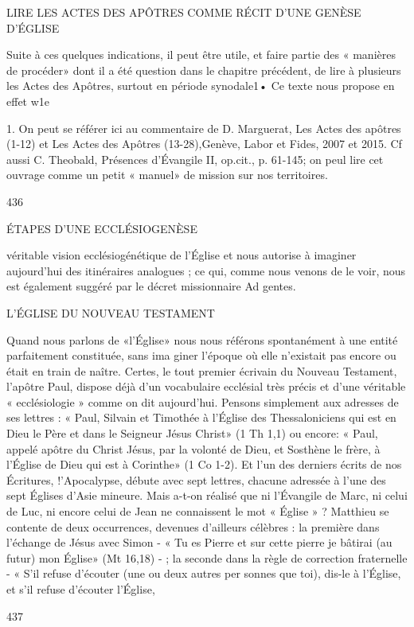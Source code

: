 LIRE LES ACTES DES APÔTRES
COMME RÉCIT D'UNE GENÈSE D'ÉGLISE

Suite à ces quelques indications, il peut être utile, et faire partie des « manières de procéder» dont il a été question dans le chapitre précédent, de lire à plusieurs les Actes des Apôtres, surtout en période synodale1• Ce texte nous propose en effet w1e

1.	On peut se référer ici au commentaire de D. Marguerat, Les Actes des apôtres (1-12) et Les Actes des Apôtres (13-28),Genève, Labor et Fides, 2007 et 2015. Cf aussi C. Theobald, Présences d'Évangile II, op.cit., p. 61-145; on peul lire cet ouvrage comme un petit « manuel» de mission sur nos territoires.

436
 
ÉTAPES D'UNE ECCLÉSIOGENÈSE

véritable vision ecclésiogénétique de l'Église et nous autorise à imaginer aujourd'hui des itinéraires analogues ; ce qui, comme nous venons de le voir, nous est également suggéré par le décret missionnaire Ad gentes.

L'ÉGLISE DU NOUVEAU TESTAMENT

Quand nous parlons de «l'Église» nous nous référons spontanément à une entité parfaitement constituée, sans ima­ giner l'époque où elle n'existait pas encore ou était en train de naître. Certes, le tout premier écrivain du Nouveau Testament, l'apôtre Paul, dispose déjà d'un vocabulaire ecclésial très précis et d'une véritable « ecclésiologie » comme on dit aujourd'hui. Pensons simplement aux adresses de ses lettres : « Paul, Silvain et Timothée à l'Église des Thessaloniciens qui est en Dieu le Père et dans le Seigneur Jésus Christ» (1 Th 1,1) ou encore: « Paul, appelé apôtre du Christ Jésus, par la volonté de Dieu, et Sosthène le frère, à l'Église de Dieu qui est à Corinthe» (1 Co 1-2). Et l'un des derniers écrits de nos Écritures, !'Apocalypse, débute avec sept lettres, chacune adressée à l'une des sept Églises d'Asie mineure.
Mais a-t-on réalisé que ni l'Évangile de Marc, ni celui de Luc, ni encore celui de Jean ne connaissent le mot « Église » ? Matthieu se contente de deux occurrences, devenues d'ailleurs célèbres : la première dans l'échange de Jésus avec Simon
- « Tu es Pierre et sur cette pierre je bâtirai (au futur) mon Église» (Mt 16,18) - ; la seconde dans la règle de correction fraternelle - « S'il refuse d'écouter (une ou deux autres per­ sonnes que toi), dis-le à l'Église, et s'il refuse d'écouter l'Église,

437
 
